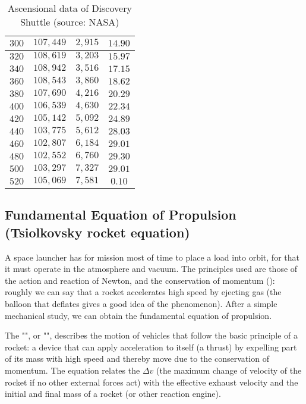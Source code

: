 \begin{table}[H]
\begin{center}
\begin{tabular}{|c|c|c|c|}
				$300$ & $107,449$ & $2,915$ & $14.90$\\ \hline
				$320$ & $108,619$ & $3,203$ & $15.97$\\ \hline
				$340$ & $108,942$ & $3,516$ & $17.15$\\ \hline
				$360$ & $108,543$ & $3,860$ & $18.62$\\ \hline
				$380$ & $107,690$ & $4,216$ & $20.29$\\ \hline
				$400$ & $106,539$ & $4,630$ & $22.34$\\ \hline
				$420$ & $105,142$ & $5,092$ & $24.89$\\ \hline
				$440$ & $103,775$ & $5,612$ & $28.03$\\ \hline
				$460$ & $102,807$ & $6,184$ & $29.01$\\ \hline
				$480$ & $102,552$ & $6,760$ & $29.30$\\ \hline
				$500$ & $103,297$ & $7,327$ & $29.01$\\ \hline
				$520$ & $105,069$ & $7,581$ & $0.10$\\  \hline
 		\end{tabular}
		\end{center}
		\caption[Ascensional data of Discovery Shuttle]{Ascensional data of Discovery Shuttle (source: NASA)}
	\end{table}
	
	\subsection{Fundamental Equation of Propulsion (Tsiolkovsky rocket equation)}
	A space launcher has for mission most of time to place a load into orbit, for that it must operate in the atmosphere and vacuum. The principles used are those of the action and reaction of Newton, and the conservation of momentum (): roughly we can say that a rocket accelerates high speed by ejecting gas (the balloon that deflates gives a good idea of the phenomenon). After a simple mechanical study, we can obtain the fundamental equation of propulsion.
	
	The "", or "", describes the motion of vehicles that follow the basic principle of a rocket: a device that can apply acceleration to itself (a thrust) by expelling part of its mass with high speed and thereby move due to the conservation of momentum. The equation relates the $\Delta v$ (the maximum change of velocity of the rocket if no other external forces act) with the effective exhaust velocity and the initial and final mass of a rocket (or other reaction engine).
	
